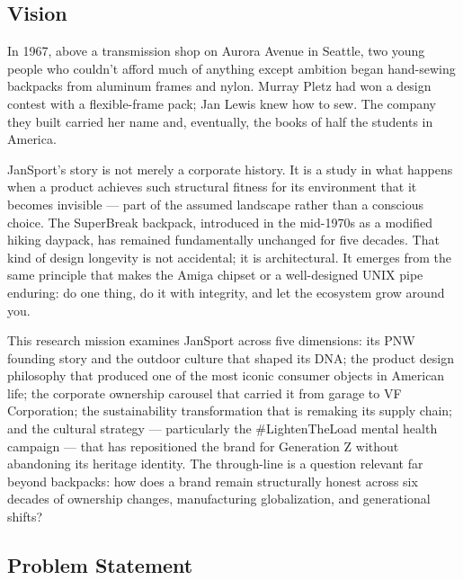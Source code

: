 \documentclass[11pt,letterpaper]{article}
\begin{document}
\subsection{Vision}

In 1967, above a transmission shop on Aurora Avenue in Seattle, two young people who couldn't afford much of anything except ambition began hand-sewing backpacks from aluminum frames and nylon. Murray Pletz had won a design contest with a flexible-frame pack; Jan Lewis knew how to sew. The company they built carried her name and, eventually, the books of half the students in America.

JanSport's story is not merely a corporate history. It is a study in what happens when a product achieves such structural fitness for its environment that it becomes invisible --- part of the assumed landscape rather than a conscious choice. The SuperBreak backpack, introduced in the mid-1970s as a modified hiking daypack, has remained fundamentally unchanged for five decades. That kind of design longevity is not accidental; it is architectural. It emerges from the same principle that makes the Amiga chipset or a well-designed UNIX pipe enduring: do one thing, do it with integrity, and let the ecosystem grow around you.

This research mission examines JanSport across five dimensions: its PNW founding story and the outdoor culture that shaped its DNA; the product design philosophy that produced one of the most iconic consumer objects in American life; the corporate ownership carousel that carried it from garage to VF Corporation; the sustainability transformation that is remaking its supply chain; and the cultural strategy --- particularly the \#LightenTheLoad mental health campaign --- that has repositioned the brand for Generation Z without abandoning its heritage identity. The through-line is a question relevant far beyond backpacks: how does a brand remain structurally honest across six decades of ownership changes, manufacturing globalization, and generational shifts?

\subsection{Problem Statement}
\end{document}
